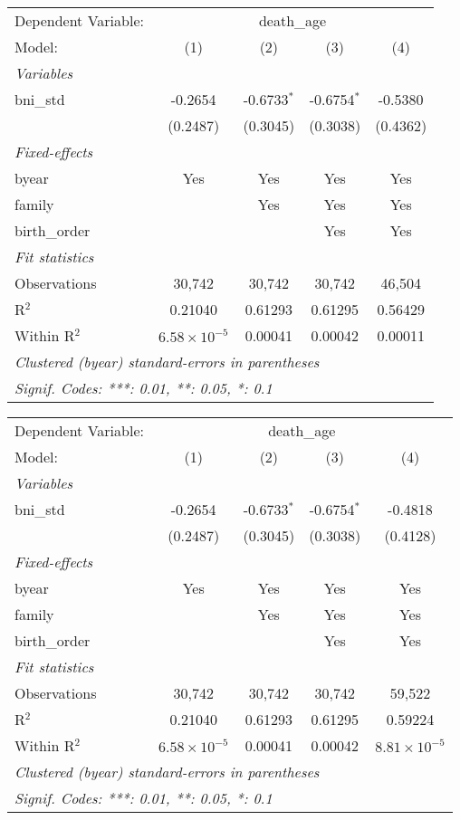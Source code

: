 \begin{tabular}{lcccc}
\tabularnewline\midrule\midrule
Dependent Variable: & \multicolumn{4}{c}{death\_age}\\
Model: & (1) & (2) & (3) & (4)\\
\midrule \emph{Variables} &   &   &   &  \\
bni\_std & -0.2654 & -0.6733$^{*}$ & -0.6754$^{*}$ & -0.5380\\
  & (0.2487) & (0.3045) & (0.3038) & (0.4362)\\
\midrule \emph{Fixed-effects} &   &   &   &  \\
byear & Yes & Yes & Yes & Yes\\
family &  & Yes & Yes & Yes\\
birth\_order &  &  & Yes & Yes\\
\midrule \emph{Fit statistics} &   &   &   &  \\
Observations & 30,742 & 30,742 & 30,742 & 46,504\\
R$^2$ & 0.21040 & 0.61293 & 0.61295 & 0.56429\\
Within R$^2$ & $6.58\times 10^{-5}$ & 0.00041 & 0.00042 & 0.00011\\
\midrule\midrule\multicolumn{5}{l}{\emph{Clustered (byear) standard-errors in parentheses}}\\
\multicolumn{5}{l}{\emph{Signif. Codes: ***: 0.01, **: 0.05, *: 0.1}}\\
\end{tabular}



\begin{tabular}{lcccc}
\tabularnewline\midrule\midrule
Dependent Variable: & \multicolumn{4}{c}{death\_age}\\
Model: & (1) & (2) & (3) & (4)\\
\midrule \emph{Variables} &   &   &   &  \\
bni\_std & -0.2654 & -0.6733$^{*}$ & -0.6754$^{*}$ & -0.4818\\
  & (0.2487) & (0.3045) & (0.3038) & (0.4128)\\
\midrule \emph{Fixed-effects} &   &   &   &  \\
byear & Yes & Yes & Yes & Yes\\
family &  & Yes & Yes & Yes\\
birth\_order &  &  & Yes & Yes\\
\midrule \emph{Fit statistics} &   &   &   &  \\
Observations & 30,742 & 30,742 & 30,742 & 59,522\\
R$^2$ & 0.21040 & 0.61293 & 0.61295 & 0.59224\\
Within R$^2$ & $6.58\times 10^{-5}$ & 0.00041 & 0.00042 & $8.81\times 10^{-5}$\\
\midrule\midrule\multicolumn{5}{l}{\emph{Clustered (byear) standard-errors in parentheses}}\\
\multicolumn{5}{l}{\emph{Signif. Codes: ***: 0.01, **: 0.05, *: 0.1}}\\
\end{tabular}



